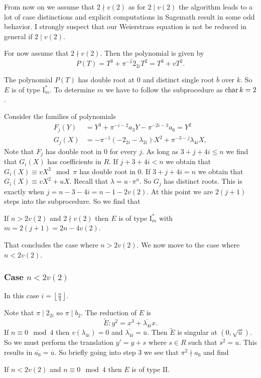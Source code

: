 From now on we assume that $2\nmid v(2)$ as for $2 \mid v(2) $ the algorithm leads to a lot of case distinctions and explicit computations in Sagemath result in some odd behavior. 
I strongly suspect that our Weierstrass equation is not be reduced in general if $2\mid v(2) $. 

For now assume that $2 \nmid v(2)$. 
Then the polynomial is given by \[
	P(T) = T^3 + \overline{\pi^{-1} 2_{2i}} T^2 = T^3 + vT^2
.\] 

The polynomial  $P(T)$ has double root at $0$ and distinct single root $\overline{b}$ over $k$. 
So $E$ is of type $\mathrm I_m^*$. 
To determine $m$ we have to follow the subprocedure as $\operatorname{char} k = 2$. 

Consider the families of polynomials 
\begin{align*}
	F_j(Y) &= Y^3 + \pi^{-i-2} a_3 Y - \pi^{-2i-3} a_6 = Y^2 \\
	G_j(X) &= -\pi^{-1}(-2_{2i} - \lambda_{2i}) X^2 + \pi^{-3 - j}\lambda_{4i} X
,\end{align*}
Note that $F_j$ has double root in $0$ for every $j$.  
As long as $3 + j + 4i \le n$ we find that $G_i(X)$ has coefficients in $R$. 
If $j + 3 + 4i <  n$ we obtain that $G_i(X) \equiv v X^2 \mod \pi$ has double root in $0$. 
If $3 + j + 4i = n$ we obtain that $G_i(X) \equiv v X^2 + uX$. Recall that $\lambda = u \cdot \pi^{n}$. 
So $G_j$ has distinct roots. 
This is exactly when $j = n - 3 - 4i = n - 1 - 2v(2)$. 
At this point we are $2(j + 1)$ steps into the subprocedure. 
So we find that 
\begin{tateconclusion}
	If $n > 2v(2)$ and $2\nmid v(2)$ then $E$ is of type $\mathrm I_m^*$ with  $m = 2(j + 1) = 2n - 4v(2)$.
\end{tateconclusion}


That concludes the case where $n > 2v(2)$. 
We now move to the case where $n < 2v(2)$. 

\subsubsection{Case $n < 2v(2)$} \label{sec:case_n_<_2v2}

In this case $i = \left\lfloor \frac{n}{4} \right\rfloor$.

Note that $\pi\mid 2_{2i}$ so $\pi\mid b_2$. 
The reduction of $E$ is 
\[
\tilde E: y^2 = x^3 +  \overline{\lambda_{4i}}x
.\] 
If $n \equiv 0 \mod 4$ then $v(\lambda_{4i}) = 0$ and $\overline{\lambda_{4i}} = \overline{u}$. 
Then $\tilde E$ is singular at $(0, \sqrt{\overline{u}})$. 
So we must perform the translation $y' = y + s $ where $s \in R$ such that $\overline{s}^2 = u$. This results in $\overline{a_6} = \overline{u}$.
So briefly going into step $3$ we see that $\pi^2 \nmid a_6$ and find 
\begin{tateconclusion}
	If $n < 2v(2)$ and $n \equiv 0 \mod 4$ then $E$ is of type $\mathrm{II}$. 
\end{tateconclusion}

